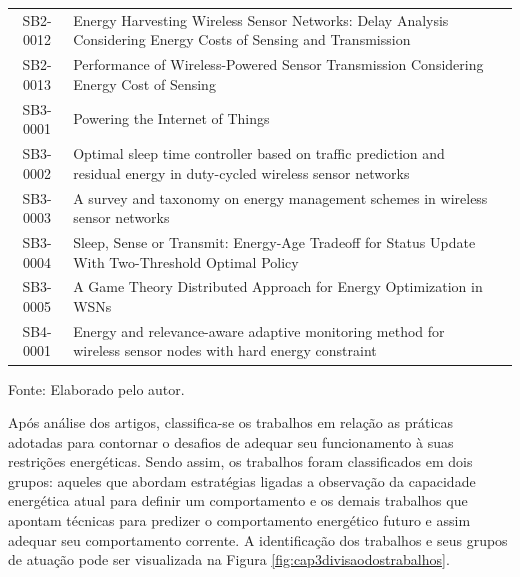 \begin{table}[ht]
\begin{tabular}{cp{11cm}c}
		SB2-0012 &	Energy Harvesting Wireless Sensor Networks: Delay Analysis Considering Energy Costs of Sensing and Transmission& \\
		SB2-0013 &	Performance of Wireless-Powered Sensor Transmission Considering Energy Cost of Sensing &\\
		SB3-0001 &  Powering the Internet of Things&\\
		SB3-0002 & Optimal sleep time controller based on traffic prediction and residual energy in duty-cycled wireless sensor networks &\\
		SB3-0003 & A survey and taxonomy on energy management schemes in wireless sensor networks& \\
		SB3-0004 & Sleep, Sense or Transmit: Energy-Age Tradeoff for Status Update With Two-Threshold Optimal Policy &\\
		SB3-0005 & A Game Theory Distributed Approach for Energy Optimization in WSNs&\\
		SB4-0001 & Energy and relevance-aware adaptive monitoring method for wireless sensor	nodes with hard energy constraint&\\\bottomrule
		
	\end{tabular}
		\label{table:cap3:trabalhosobservados}
		
		Fonte: Elaborado pelo autor.
\end{table}
\endgroup

Após análise dos artigos, classifica-se os trabalhos em relação as práticas adotadas para contornar o desafios de adequar seu funcionamento à suas restrições energéticas. Sendo assim, os trabalhos foram classificados em dois grupos: aqueles que abordam estratégias ligadas a observação da capacidade energética atual para definir um comportamento e os demais trabalhos que apontam técnicas para predizer o comportamento energético futuro e assim adequar seu comportamento corrente. A identificação dos trabalhos e seus grupos de atuação pode ser visualizada na Figura \ref{fig:cap3divisaodostrabalhos}.







